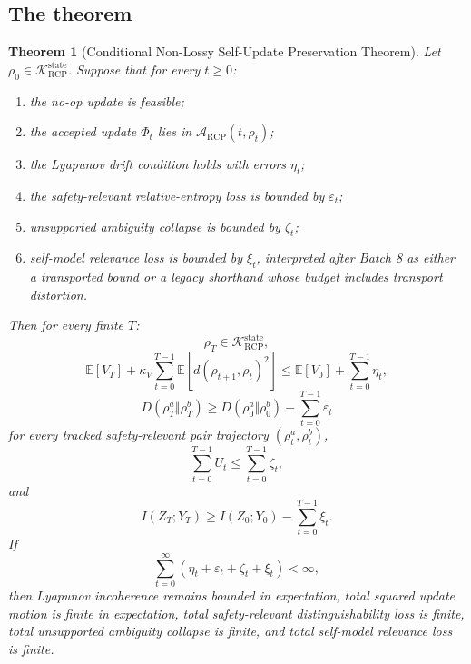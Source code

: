 \documentclass[11pt]{article}
\newtheorem{theorem}{Theorem}[section]
\newcommand{\K}{\mathcal{K}}
\newcommand{\Acal}{\mathcal{A}}
\newcommand{\1}{\mathbf{1}}
\newcommand{\eps}{\varepsilon}
\newcommand{\RCP}{\mathrm{RCP}}
\newcommand{\state}{\mathrm{state}}
\begin{document}
\subsection{The theorem}

\begin{theorem}[Conditional Non-Lossy Self-Update Preservation Theorem]
\label{thm:main_rcp}
Let \(\rho_0\in\K_{\RCP}^{\state}\). Suppose that for every \(t\ge0\):
\begin{enumerate}[label=(\roman*)]
    \item the no-op update is feasible;
    \item the accepted update \(\Phi_t\) lies in \(\Acal_{\RCP}(t,\rho_t)\);
    \item the Lyapunov drift condition holds with errors \(\eta_t\);
    \item the safety-relevant relative-entropy loss is bounded by \(\eps_t\);
    \item unsupported ambiguity collapse is bounded by \(\zeta_t\);
    \item self-model relevance loss is bounded by \(\xi_t\), interpreted after Batch 8 as either a transported bound or a legacy shorthand whose budget includes transport distortion.
\end{enumerate}
Then for every finite \(T\):
\[
\rho_T\in\K_{\RCP}^{\state},
\]
\[
\mathbb E[V_T]
+
\kappa_V\sum_{t=0}^{T-1}\mathbb E[d(\rho_{t+1},\rho_t)^2]
\le
\mathbb E[V_0]+
\sum_{t=0}^{T-1}\eta_t,
\]
\[
D(\rho_T^a\Vert\rho_T^b)
\ge
D(\rho_0^a\Vert\rho_0^b)-
\sum_{t=0}^{T-1}\eps_t
\]
for every tracked safety-relevant pair trajectory \((\rho_t^a,\rho_t^b)\),
\[
\sum_{t=0}^{T-1}U_t
\le
\sum_{t=0}^{T-1}\zeta_t,
\]
and
\[
I(Z_T;Y_T)
\ge
I(Z_0;Y_0)-\sum_{t=0}^{T-1}\xi_t.
\]
If
\[
\sum_{t=0}^{\infty}(\eta_t+\eps_t+\zeta_t+\xi_t)<\infty,
\]
then Lyapunov incoherence remains bounded in expectation, total squared update motion is finite in expectation, total safety-relevant distinguishability loss is finite, total unsupported ambiguity collapse is finite, and total self-model relevance loss is finite.
\end{theorem}
\end{document}
